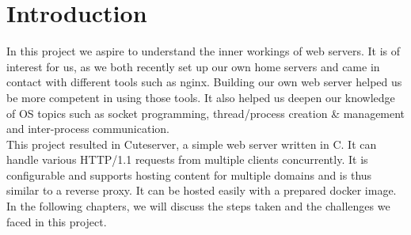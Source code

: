 \section*{Introduction}
In this project we aspire to understand the inner workings of web servers. It is of interest for us, as we both recently set up our own home servers and came in contact with different tools such as nginx. Building our own web server helped us be more competent in using those tools. It also helped us deepen our knowledge of OS topics such as socket programming, thread/process creation \& management and inter-process communication.  \\

This project resulted in Cuteserver, a simple web server written in C. It can handle various HTTP/1.1 requests from multiple clients concurrently. It is configurable and supports hosting content for multiple domains and is thus similar to a reverse proxy. It can be hosted easily with a prepared docker image. In the following chapters, we will discuss the steps taken and the challenges we faced in this project. 

